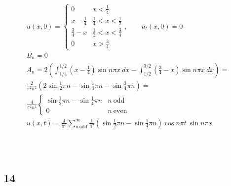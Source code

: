 \begin{gather*}
	u(x, 0) = \left\{
		\begin{matrix*}
			0					& x < \frac{1}{4}				\\
			x - \frac{1}{4}		& \frac{1}{4} < x < \frac{1}{2}	\\
			\frac{3}{4} - x		& \frac{1}{2} < x < \frac{3}{4}	\\
			0					& x > \frac{3}{4}
		\end{matrix*}
	\right. ,
	\qquad
	u_t(x, 0) = 0
	\\
	B_n = 0
	\\
	A_n = 2 \left(
		\int_{1/4}^{1/2}{
			\left(
				x - \frac{1}{4}
			\right)
			\sin{n \pi x}\ dx
		}
		-
		\int_{1/2}^{3/2}{
			\left(
				\frac{3}{4} - x
			\right)
			\sin{n \pi x}\ dx
		}
	\right)
	=
	\\
	\frac{2}{\pi^2 n^2} \left(
		2 \sin{\frac{1}{2} \pi n}
		-
		\sin{\frac{1}{4} \pi n}
		-
		\sin{\frac{3}{4} \pi n}
	\right)
	=
	\\
	\frac{4}{\pi^2 n^2} \left\{
		\begin{matrix*}
			\sin{\frac{1}{2} \pi n} - \sin{\frac{1}{4} \pi n}	& n\ \text{odd}	\\
			0													& n\ \text{even}
		\end{matrix*}
	\right.
	\\
	u(x, t) = \frac{4}{\pi^2} \sum_{n\ \text{odd}}^\infty{\frac{1}{n^2} \left(
		\sin{\frac{1}{2} \pi n} - \sin{\frac{1}{4} \pi n}
	\right) \cos{n \pi t}\ \sin{n \pi x}}
\end{gather*}

\bigskip

\bigskip
\\
\bigskip
\\

\newpage

\subsection*{14}


